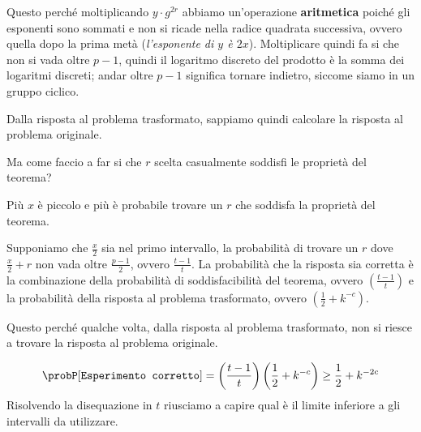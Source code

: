 Questo perché moltiplicando $y \cdot g^{2r}$ abbiamo un'operazione \textbf{aritmetica} poiché 
gli esponenti sono sommati e non si ricade nella 
radice quadrata successiva, ovvero quella dopo la prima metà (\textit{l'esponente di 
$y$ è $2x$}). Moltiplicare quindi fa si che non si vada 
oltre $p - 1$, quindi il logaritmo discreto del prodotto è la somma dei logaritmi discreti;
andar oltre $p - 1$ significa tornare indietro, siccome siamo in un gruppo ciclico.

Dalla risposta al problema trasformato, sappiamo quindi calcolare la risposta al problema originale.

Ma come faccio a far si che $r$ scelta casualmente soddisfi le proprietà del teorema?
\begin{tcolorbox}
  Più $x$ è piccolo e più è probabile trovare un $r$ che soddisfa la proprietà del teorema.
\end{tcolorbox}
\begin{figure}[H]
  \centering 
\end{figure}
Supponiamo che $\frac{x}{2}$ sia nel primo intervallo, la probabilità di trovare un $r$ dove 
$\frac{x}{2} + r$ non vada oltre $\frac{p - 1}{2}$, ovvero $\frac{t - 1}{t}$.
La probabilità che la risposta sia corretta è la combinazione della probabilità di 
soddisfacibilità del teorema, ovvero $\left( \frac{t - 1}{t}\right)$ e la probabilità
della risposta al problema trasformato, ovvero $\left( \frac{1}{2} + k^{-c}\right)$.

Questo perché qualche volta, dalla risposta al problema trasformato, non si riesce a
trovare la risposta al problema originale.

\begin{equation}
  \probP[\texttt{Esperimento corretto}] = \left( \frac{t - 1}{t}\right) \left( \frac{1}{2} + k^{-c}\right)
  \geq \frac{1}{2} + k^{-2c}
\end{equation}
Risolvendo la disequazione in $t$ riusciamo a capire qual è il limite inferiore a gli intervalli da utilizzare.

